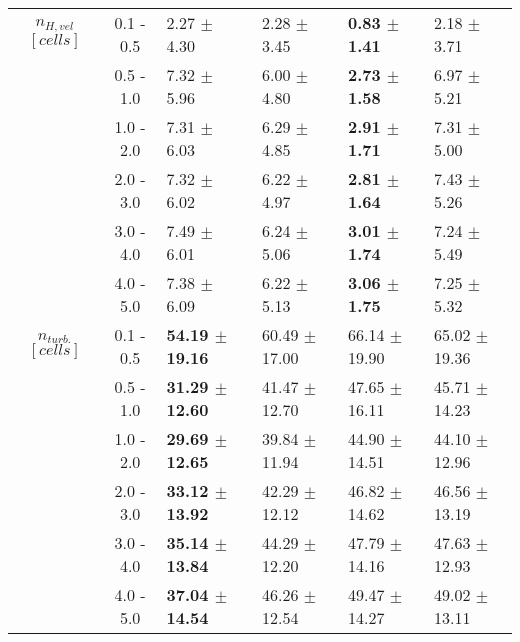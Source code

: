 \documentclass[final,5p,times,twocolumn]{elsarticle}
\begin{document}
\begin{table*}[!h]
\begin{tabular}{ c c | l l l l }
  $n_{H,vel}$ $[cells]$   & 0.1 - 0.5 & 2.27 $\pm$ 4.30         & 2.28 $\pm$ 3.45         & \textbf{0.83 $\pm$ 1.41}         & 2.18 $\pm$ 3.71\\
               & 0.5 - 1.0 & 7.32 $\pm$ 5.96         & 6.00 $\pm$ 4.80         & \textbf{2.73 $\pm$ 1.58}         & 6.97 $\pm$ 5.21\\
                & 1.0 - 2.0 & 7.31 $\pm$ 6.03         & 6.29 $\pm$ 4.85         & \textbf{2.91 $\pm$ 1.71}         & 7.31 $\pm$ 5.00\\
                & 2.0 - 3.0 & 7.32 $\pm$ 6.02         & 6.22 $\pm$ 4.97         & \textbf{2.81 $\pm$ 1.64}         & 7.43 $\pm$ 5.26\\
                & 3.0 - 4.0 & 7.49 $\pm$ 6.01         & 6.24 $\pm$ 5.06         & \textbf{3.01 $\pm$ 1.74}         & 7.24 $\pm$ 5.49\\
                & 4.0 - 5.0 & 7.38 $\pm$ 6.09         & 6.22 $\pm$ 5.13         & \textbf{3.06 $\pm$ 1.75}         & 7.25 $\pm$ 5.32\\ \hline
                
  $n_{turb.}$ $[cells]$   & 0.1 - 0.5 & \textbf{54.19 $\pm$ 19.16}       & 60.49 $\pm$ 17.00       & 66.14 $\pm$ 19.90         & 65.02 $\pm$ 19.36\\
                 & 0.5 - 1.0 & \textbf{31.29 $\pm$ 12.60}       & 41.47 $\pm$ 12.70       & 47.65 $\pm$ 16.11         & 45.71 $\pm$ 14.23\\
                & 1.0 - 2.0 & \textbf{29.69 $\pm$ 12.65}       & 39.84 $\pm$ 11.94       & 44.90 $\pm$ 14.51         & 44.10 $\pm$ 12.96\\
                & 2.0 - 3.0 & \textbf{33.12 $\pm$ 13.92}       & 42.29 $\pm$ 12.12       & 46.82 $\pm$ 14.62         & 46.56 $\pm$ 13.19\\
                & 3.0 - 4.0 & \textbf{35.14 $\pm$ 13.84}       & 44.29 $\pm$ 12.20       & 47.79 $\pm$ 14.16         & 47.63 $\pm$ 12.93\\
                & 4.0 - 5.0 & \textbf{37.04 $\pm$ 14.54}       & 46.26 $\pm$ 12.54       & 49.47 $\pm$ 14.27         & 49.02 $\pm$ 13.11\\ \hline
                

\end{tabular}
\end{table*}
\end{document}
